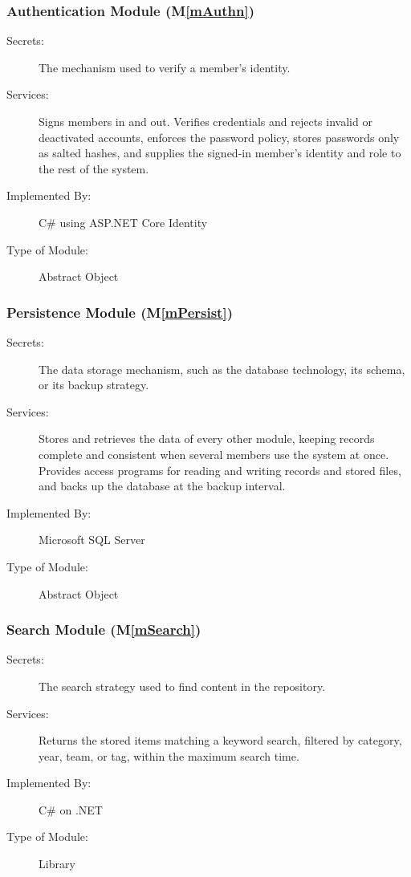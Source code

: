 \documentclass[12pt, titlepage]{article}
\begin{document}
\subsubsection{Authentication Module (M\ref*{mAuthn})}\label{mAuthn:dec}

\begin{description}
\item[Secrets:] The mechanism used to verify a member's identity.
\item[Services:] Signs members in and out. Verifies credentials and rejects
  invalid or deactivated accounts, enforces the password policy, stores
  passwords only as salted hashes, and supplies the signed-in member's identity
  and role to the rest of the system.
\item[Implemented By:] C\# using ASP.NET Core Identity
\item[Type of Module:] Abstract Object
\end{description}

\subsubsection{Persistence Module (M\ref*{mPersist})}\label{mPersist:dec}

\begin{description}
\item[Secrets:] The data storage mechanism, such as the database technology, its schema, or its backup strategy.
\item[Services:] Stores and retrieves the data of every other module, keeping
  records complete and consistent when several members use the system at once.
  Provides access programs for reading and writing records and stored files, and
  backs up the database at the backup interval.
\item[Implemented By:] Microsoft SQL Server
\item[Type of Module:] Abstract Object
\end{description}

\subsubsection{Search Module (M\ref*{mSearch})}\label{mSearch:dec}

\begin{description}
\item[Secrets:] The search strategy used to find content in the repository.
\item[Services:] Returns the stored items matching a keyword search, filtered by
  category, year, team, or tag, within the maximum search time.
\item[Implemented By:] C\# on .NET
\item[Type of Module:] Library
\end{description}
\end{document}
